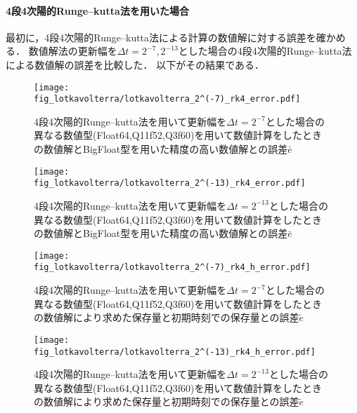 \paragraph*{4段4次陽的Runge--kutta法を用いた場合}
最初に，4段4次陽的Runge--kutta法による計算の数値解に対する誤差を確かめる．
数値解法の更新幅を$\Delta t = 2^{-7},2^{-13}$とした場合の4段4次陽的Runge--kutta法による数値解の誤差を比較した．
以下がその結果である．
\begin{figure}[H]
    \centering
    \begin{minipage}[b]{0.48\columnwidth}
        \centering
        \texttt{[image: fig\_lotkavolterra/lotkavolterra\_2^(-7)\_rk4\_error.pdf]}
        \caption{4段4次陽的Runge--kutta法を用いて更新幅を$\Delta t = 2^{-7}$とした場合の異なる数値型(Float64,Q11f52,Q3f60)を用いて数値計算をしたときの数値解とBigFloat型を用いた精度の高い数値解との誤差$\bar{e}$}
        \label{fig:lotkavolterra_2^(-7)_rk4_error}
    \end{minipage}
    \hspace{0.01\columnwidth}
    \begin{minipage}[b]{0.48\columnwidth}
        \centering
        \texttt{[image: fig\_lotkavolterra/lotkavolterra\_2^(-13)\_rk4\_error.pdf]}
        \caption{4段4次陽的Runge--kutta法を用いて更新幅を$\Delta t =  2^{-13}$とした場合の異なる数値型(Float64,Q11f52,Q3f60)を用いて数値計算をしたときの数値解とBigFloat型を用いた精度の高い数値解との誤差$\bar{e}$}
        \label{fig:lotkavolterra_2^(-13)_rk4_error}
    \end{minipage}
\end{figure}
\begin{figure}[H]
    \centering
    \begin{minipage}[b]{0.48\columnwidth}
        \centering
        \texttt{[image: fig\_lotkavolterra/lotkavolterra\_2^(-7)\_rk4\_h\_error.pdf]}
        \caption{4段4次陽的Runge--kutta法を用いて更新幅を$\Delta t = 2^{-7}$とした場合の異なる数値型(Float64,Q11f52,Q3f60)を用いて数値計算をしたときの数値解により求めた保存量と初期時刻での保存量との誤差$\tilde{e}$}
        \label{fig:lotkavolterra_2^(-7)_rk4_h_error}
    \end{minipage}
    \hspace{0.01\columnwidth}
    \begin{minipage}[b]{0.48\columnwidth}
        \centering
        \texttt{[image: fig\_lotkavolterra/lotkavolterra\_2^(-13)\_rk4\_h\_error.pdf]}
        \caption{4段4次陽的Runge--kutta法を用いて更新幅を$\Delta t =  2^{-13}$とした場合の異なる数値型(Float64,Q11f52,Q3f60)を用いて数値計算をしたときの数値解により求めた保存量と初期時刻での保存量との誤差$\tilde{e}$}
        \label{fig:lotkavolterra_2^(-13)_rk4_h_error}
    \end{minipage}
\end{figure}

